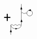 \begin{equation}
\begin{tikzpicture}[x=0.55pt,y=0.55pt,yscale=-1,xscale=1]
\draw    (470.14,45.82) -- (470.14,102) ;
\draw  [fill={rgb, 255:red, 0; green, 0; blue, 0 }  ,fill opacity=1 ] (470.62,87.89) -- (472.81,93.71) -- (468.43,93.71) -- cycle ;
\draw   (485.1,70.26) .. controls (485.1,65.98) and (488.57,62.51) .. (492.85,62.51) .. controls (497.13,62.51) and (500.6,65.98) .. (500.6,70.26) .. controls (500.6,74.54) and (497.13,78.01) .. (492.85,78.01) .. controls (488.57,78.01) and (485.1,74.54) .. (485.1,70.26) -- cycle ;
\draw    (470.24,70.26) .. controls (471.91,68.59) and (473.57,68.59) .. (475.24,70.26) .. controls (476.91,71.93) and (478.57,71.93) .. (480.24,70.26) -- (485.1,70.26) -- (485.1,70.26) ;
\draw  [fill={rgb, 255:red, 0; green, 0; blue, 0 }  ,fill opacity=1 ] (489.95,62.72) -- (495.59,60.11) -- (495.91,64.48) -- cycle ;
\draw  [fill={rgb, 255:red, 0; green, 0; blue, 0 }  ,fill opacity=1 ] (441.61,115.45) -- (443.8,121.26) -- (439.42,121.26) -- cycle ;
\draw    (441.61,102.3) .. controls (443.28,100.63) and (444.94,100.63) .. (446.61,102.3) .. controls (448.28,103.97) and (449.94,103.97) .. (451.61,102.3) .. controls (453.28,100.63) and (454.94,100.63) .. (456.61,102.3) .. controls (458.28,103.97) and (459.94,103.97) .. (461.61,102.3) .. controls (463.28,100.63) and (464.94,100.63) .. (466.61,102.3) -- (469.88,102.3) -- (469.88,102.3) ;
\draw    (441.61,102.3) .. controls (441.29,115.82) and (469.88,115.82) .. (469.88,102.3) ;
\draw  [fill={rgb, 255:red, 0; green, 0; blue, 0 }  ,fill opacity=1 ] (458.7,112.17) -- (454.65,113.99) -- (454.56,110.9) -- cycle ;
\draw    (441.61,102.3) -- (441.61,128.6) ;
\draw  [fill={rgb, 255:red, 0; green, 0; blue, 0 }  ,fill opacity=1 ] (470.14,54.09) -- (472.33,59.91) -- (467.95,59.91) -- cycle ;
\draw [line width=1.5]    (423.25,81.8) -- (440.25,81.8) ;
\draw [line width=1.5]    (431.75,91.4) -- (431.75,72.21) ;


\end{tikzpicture}
\end{equation}

